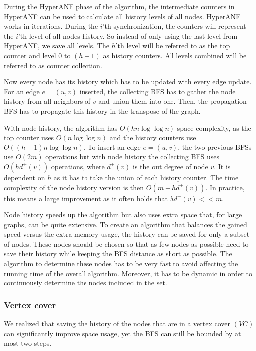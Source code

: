 During the HyperANF phase of the algorithm, the intermediate counters in HyperANF can be used to calculate all history levels of all nodes. HyperANF works in iterations. During the $i$'th synchronization, the counters will represent the $i$'th level of all nodes history. So instead of only using the last level from HyperANF, we save all levels. The $h$'th level will be referred to as the top counter and level $0$ to $(h-1)$ as history counters. All levels combined will be referred to as counter collection.  

Now every node has its history which has to be updated with every edge update. For an edge $e = (u,v)$ inserted, the collecting BFS has to gather the node history from all neighbors of $v$ and union them into one. Then, the propagation BFS has to propagate this history in the transpose of the graph. 

With node history, the algorithm has $O(hn \log \log n)$ space complexity, as the top counter uses $O(n \log \log n)$ and the history counters use $O((h-1)n \log \log n)$. To insert an edge $e = (u,v)$, the two previous BFSs use $O(2m)$ operations but with node history the collecting BFS uses $O(hd^+(v))$ operations, where $d^+(v)$ is the out degree of node $v$. It is dependent on $h$ as it has to take the union of each history counter. The time complexity of the node history version is then $O(m + hd^+(v))$. In practice, this means a large improvement as it often holds that $hd^+(v) << m$.

Node history speeds up the algorithm but also uses extra space that, for large graphs, can be quite extensive. To create an algorithm that balances the gained speed versus the extra memory usage, the history can be saved for only a subset of nodes. These nodes should be chosen so that as few nodes as possible need to save their history while keeping the BFS distance as short as possible. The algorithm to determine these nodes has to be very fast to avoid affecting the running time of the overall algorithm. Moreover, it has to be dynamic in order to continuously determine the nodes included in the set.

\subsubsection{Vertex cover}
\label{sec:vertex_cover}
We realized that saving the history of the nodes that are in a vertex cover $(VC)$ can significantly improve space usage, yet the BFS can still be bounded by at most two steps.

